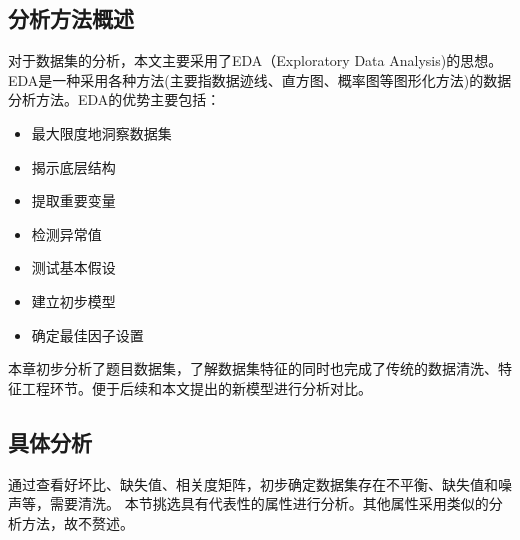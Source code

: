 \subsection{分析方法概述}
对于数据集的分析，本文主要采用了EDA（Exploratory Data Analysis)的思想。\\
EDA是一种采用各种方法(主要指数据迹线、直方图、概率图等图形化方法)的数据分析方法。EDA的优势主要包括：
\begin{itemize}
	\item 最大限度地洞察数据集
	\item 揭示底层结构
	\item 提取重要变量
	\item 检测异常值
	\item 测试基本假设
	\item 建立初步模型
	\item 确定最佳因子设置
\end{itemize}
本章初步分析了题目数据集，了解数据集特征的同时也完成了传统的数据清洗、特征工程环节。便于后续和本文提出的新模型进行分析对比。
\subsection{具体分析}
通过查看好坏比、缺失值、相关度矩阵，初步确定数据集存在不平衡、缺失值和噪声等，需要清洗。
本节挑选具有代表性的属性进行分析。其他属性采用类似的分析方法，故不赘述。
